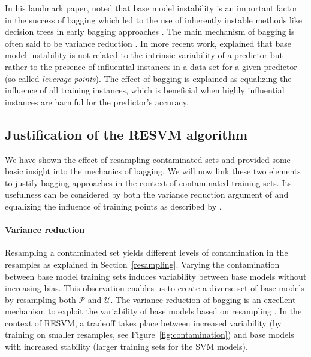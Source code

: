 \documentclass[preprint,elsarticle-num,12pt]{elsarticle}
\begin{document}
In his landmark paper, \citet{Breiman:1996:BP:231986.231989} noted that base model instability is an important factor in the success of bagging which led to the use of inherently instable methods like decision trees in early bagging approaches \citep{dietterich2000experimental, breiman2001random}. The main mechanism of bagging is often said to be variance reduction \citep{bauer1999empirical,breiman2000randomizing}. In more recent work, \citet{grandvalet2004bagging} explained that base model instability is not related to the intrinsic variability of a predictor but rather to the presence of influential instances in a data set for a given predictor (so-called \emph{leverage points}). The effect of bagging is explained as equalizing the influence of all training instances, which is beneficial when highly influential instances are harmful for the predictor's accuracy. 


\subsection{Justification of the RESVM algorithm}
We have shown the effect of resampling contaminated sets and provided some basic insight into the mechanics of bagging. We will now link these two elements to justify bagging approaches in the context of contaminated training sets. Its usefulness can be considered by both the variance reduction argument of \citet{bauer1999empirical} and equalizing the influence of training points as described by \citet{grandvalet2004bagging}.

\paragraph{Variance reduction} Resampling a contaminated set yields different levels of contamination in the resamples as explained in Section~\ref{resampling}. Varying the contamination between base model training sets induces variability between base models without increasing bias. This observation enables us to create a diverse set of base models by resampling both $\mathcal{P}$ and $\mathcal{U}$. The variance reduction of bagging is an excellent mechanism to exploit the variability of base models based on resampling \citep{bauer1999empirical,breiman2000randomizing}. In the context of RESVM, a tradeoff takes place between increased variability (by training on smaller resamples, see Figure~\ref{fig:contamination}) and base models with increased stability (larger training sets for the SVM models).
\end{document}
